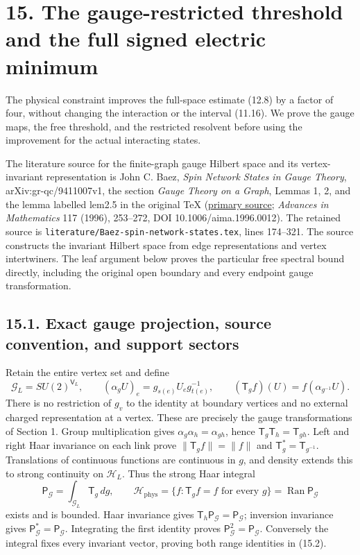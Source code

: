 \documentclass[
]{article}
\begin{document}
\section{15. The gauge-restricted threshold and the full signed electric
minimum}\label{the-gauge-restricted-threshold-and-the-full-signed-electric-minimum}

The physical constraint improves the full-space estimate (12.8) by a
factor of four, without changing the interaction or the interval
(11.16). We prove the gauge maps, the free threshold, and the restricted
resolvent before using the improvement for the actual interacting
states.

The literature source for the finite-graph gauge Hilbert space and its
vertex-invariant representation is John C. Baez, \emph{Spin Network
States in Gauge Theory}, arXiv:gr-qc/9411007v1, the section \emph{Gauge
Theory on a Graph}, Lemmas 1, 2, and the lemma labelled lem2.5 in the
original TeX (\href{https://arxiv.org/abs/gr-qc/9411007v1}{primary
source}; \emph{Advances in Mathematics} 117 (1996), 253--272, DOI
10.1006/aima.1996.0012). The retained source is
\nolinkurl{literature/Baez-spin-network-states.tex}, lines 174--321. The
source constructs the invariant Hilbert space from edge representations
and vertex intertwiners. The leaf argument below proves the particular
free spectral bound directly, including the original open boundary and
every endpoint gauge transformation.

\subsection{15.1. Exact gauge projection, source convention, and support
sectors}\label{exact-gauge-projection-source-convention-and-support-sectors}

Retain the entire vertex set and define \[
\mathcal G_L=SU(2)^{\mathsf V_L},\qquad
(\alpha_gU)_e=g_{s(e)}U_eg_{t(e)}^{-1},\qquad
(\mathsf T_g f)(U)=f(\alpha_{g^{-1}}U).                       \tag{15.1}
\] There is no restriction of \(g_v\) to the identity at boundary
vertices and no external charged representation at a vertex. These are
precisely the gauge transformations of Section 1. Group multiplication
gives \(\alpha_g\alpha_h=\alpha_{gh}\), hence
\(\mathsf T_g\mathsf T_h=\mathsf T_{gh}\). Left and right Haar
invariance on each link prove \(\|\mathsf T_g f\|=\|f\|\) and
\(\mathsf T_g^*=\mathsf T_{g^{-1}}\). Translations of continuous
functions are continuous in \(g\), and density extends this to strong
continuity on \(\mathcal H_L\). Thus the strong Haar integral \[
\mathsf P_{\mathcal G}=\int_{\mathcal G_L}\mathsf T_g\,dg,
\qquad
\mathcal H_{\mathrm{phys}}
 =\{f:\mathsf T_gf=f\text{ for every }g\}
 =\operatorname{Ran}\mathsf P_{\mathcal G}                    \tag{15.2}
\] exists and is bounded. Haar invariance gives
\(\mathsf T_h\mathsf P_{\mathcal G}=\mathsf P_{\mathcal G}\); inversion
invariance gives \(\mathsf P_{\mathcal G}^*=\mathsf P_{\mathcal G}\).
Integrating the first identity proves
\(\mathsf P_{\mathcal G}^2=\mathsf P_{\mathcal G}\). Conversely the
integral fixes every invariant vector, proving both range identities in
(15.2).
\end{document}
